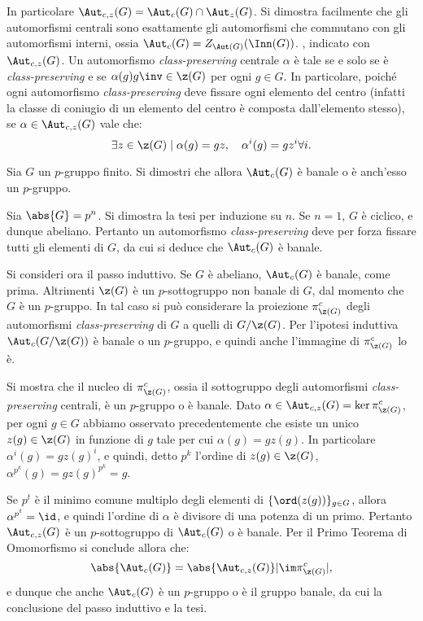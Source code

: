 \documentclass[11pt]{scrartcl}
\begin{document}
\begin{approf}
{			In
			particolare $\Aut_{c,z}(G) = \Aut_c(G) \cap \Aut_z(G)$. Si dimostra
			facilmente che gli automorfismi centrali sono esattamente gli
			automorfismi che commutano con gli automorfismi interni, ossia
			$\Aut_c(G) = Z_{\Aut(G)}(\Inn(G))$.
		}, indicato con $\Aut_{c,z}(G)$. Un
		automorfismo \textit{class-preserving} centrale $\alpha$ è tale se e solo se è
		\textit{class-preserving} e se
		$\alpha(g) g\inv \in \z(G)$ per ogni $g \in G$. In particolare,
		poiché ogni automorfismo \textit{class-preserving} deve fissare
		ogni elemento del centro (infatti la classe
		di coniugio di un elemento del centro è composta dall'elemento stesso),
		se $\alpha \in \Aut_{c,z}(G)$ vale che:
		\[ \exists z \in \z(G) \mid \alpha(g) = gz, \quad \alpha^i(g) = gz^i \forall i. \]
	\end{approf}
	
	\begin{exercise}[$\star$]
		Sia $G$ un $p$-gruppo finito. Si dimostri che allora $\Aut_c(G)$ è
		banale o è anch'esso un $p$-gruppo.
	\end{exercise}
	
	\begin{soln}
		Sia $\abs{G} = p^n$. Si dimostra la tesi per induzione su $n$.
		Se $n = 1$, $G$ è ciclico, e dunque abeliano. Pertanto un automorfismo
		\textit{class-preserving} deve per forza fissare tutti gli elementi di
		$G$, da cui si deduce che $\Aut_c(G)$ è banale. \medskip
		
		
		Si consideri ora il passo induttivo. Se $G$ è abeliano, $\Aut_c(G)$ è
		banale, come prima. Altrimenti $\z(G)$ è un $p$-sottogruppo non banale di $G$,
		dal momento che $G$ è un $p$-gruppo. In tal caso si può considerare
		la proiezione $\pi_{\z(G)}^c$ degli automorfismi \textit{class-preserving}
		di $G$ a quelli di $G / \z(G)$. Per l'ipotesi induttiva $\Aut_c(G / \z(G))$
		è banale o un $p$-gruppo, e quindi anche l'immagine di $\pi_{\z(G)}^c$ lo
		è. \medskip
		
		
		Si mostra che il nucleo di $\pi_{\z(G)}^c$, ossia il sottogruppo degli
		automorfismi \textit{class-preserving} centrali, è un $p$-gruppo o è banale. Dato $\alpha \in \Aut_{c,z}(G) = \ker \pi_{\z(G)}^c$, per ogni $g \in G$ abbiamo
		osservato precedentemente che esiste un unico $z(g) \in \z(G)$ in funzione di $g$ tale per cui
		$\alpha(g) = gz(g)$. In particolare $\alpha^i(g) = gz(g)^i$, e quindi,
		detto $p^k$ l'ordine di $z(g) \in \z(G)$, $\alpha^{p^k}(g) = gz(g)^{p^k} = g$. \medskip
		
		
		Se $p^t$ è il minimo comune multiplo degli elementi di $\{\ord(z(g))\}_{g \in G}$, allora $\alpha^{p^t} = \id$, e
		quindi l'ordine di $\alpha$ è divisore di una potenza di un primo. Pertanto
		$\Aut_{c,z}(G)$ è un $p$-sottogruppo di $\Aut_c(G)$ o è banale. Per il Primo Teorema di
		Omomorfismo si conclude allora che:
		\[ \abs{\Aut_c(G)} = \abs{\Aut_{c,z}(G)} \lvert \im \pi_{\z(G)}^c \rvert, \]
		e dunque che anche $\Aut_c(G)$ è un $p$-gruppo o è il gruppo banale, da cui la conclusione del
		passo induttivo e la tesi.
	\end{soln}
	
\end{document}
